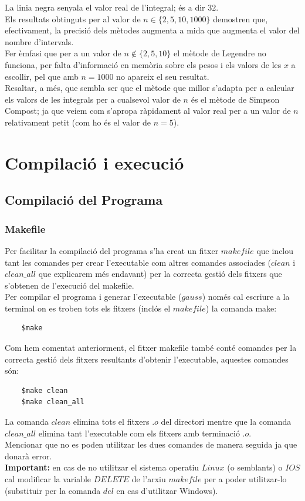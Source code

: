 \documentclass[12pt]{article}
\begin{document}
La linia negra senyala el valor real de l'integral; és a dir $32$.\\
Els resultats obtinguts per al valor de $n\in\{2,5,10,1000\}$ demostren que, efectivament, la precisió dels mètodes augmenta a mida que augmenta el valor del nombre d'intervals.\\
Fer èmfasi que per a un valor de $n\not\in\{2,5,10\}$ el mètode de Legendre no funciona, per falta d'informació en memòria sobre els pesos i els valors de les $x$ a escollir, pel que amb $n=1000$ no apareix el seu resultat.\\
Resaltar, a més, que sembla ser que el mètode que millor s'adapta per a calcular els valors de les integrals per a cualsevol valor de $n$ és el mètode de Simpson Compost; ja que veiem com s'apropa ràpidament al valor real per a un valor de $n$ relativament petit (com ho és el valor de $n=5$).


\newpage
\section{Compilació i execució}
\subsection{Compilació del Programa}
\subsubsection{Makefile}
Per facilitar la compilació del programa s'ha creat un fitxer $makefile$ que inclou tant les comandes per crear l'executable com altres comandes associades ($clean$ i $clean\_all$ que explicarem més endavant) per la correcta gestió dels fitxers que s'obtenen de l'execució del makefile.\\
Per compilar el programa i generar l'executable ($gauss$) només cal escriure a la terminal on es troben tots els fitxers (inclós el $makefile$) la comanda make: 
\begin{verbatim}
    $make
\end{verbatim}
Com hem comentat anteriorment, el fitxer makefile també conté comandes per la correcta gestió dels fitxers resultants d'obtenir l'executable, aquestes comandes són:
\begin{verbatim}
    $make clean
    $make clean_all
\end{verbatim}
La comanda $clean$ elimina tots el fitxers $.o$ del directori mentre que la comanda $clean\_all$ elimina tant l'executable com els fitxers amb terminació $.o$.\\
Mencionar que no es poden utilitzar les dues comandes de manera seguida ja que donarà error.\\
\textbf{Important:} en cas de no utilitzar el sistema operatiu $Linux$ (o semblants) o $IOS$ cal modificar la variable $DELETE$ de l'arxiu $makefile$ per a poder utilitzar-lo (substituir per la comanda $del$ en cas d'utilitzar Windows).
\end{document}
